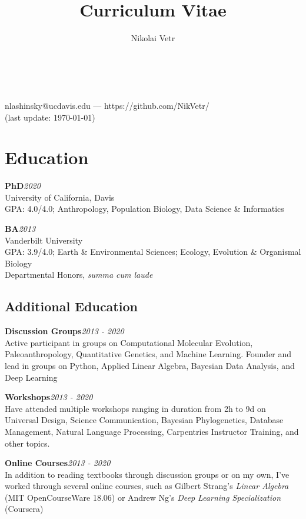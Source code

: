 \documentclass[12pt]{article}
\makeatletter
\newcommand{\cvcolor}{\color{Maroon}} %
\renewcommand{\maketitle}{
\begin{center}

{\Huge\theauthor}\\
\vspace{0.25em}
{\Large \cvcolor{University of California, Davis}}\\

nlashinsky@ucdavis.edu --- https://github.com/NikVetr/\\

{\color{Gray}(last update: \today)}
\end{center}
}
\makeatother
\begin{document}
\title{Curriculum Vitae} %
\author{Nikolai Vetr}

\maketitle

\vspace{-1.5em}

\section{Education}

\textbf{PhD}\hfill\emph{2020}\\
University of California, Davis\\
GPA: 4.0/4.0; Anthropology, Population Biology, Data Science \& Informatics

\textbf{BA}\hfill\emph{2013}\\
Vanderbilt University\\
GPA: 3.9/4.0; Earth \& Environmental Sciences; Ecology, Evolution \& Organismal Biology\\
Departmental Honors, \textit{summa cum laude}\\
\vspace{-1.25em}
\subsection{Additional Education}

\textbf{Discussion Groups}\hfill\emph{2013 - 2020}\\
Active participant in groups on Computational Molecular Evolution, Paleoanthropology, Quantitative Genetics, and Machine Learning. Founder and lead in groups on Python, Applied Linear Algebra, Bayesian Data Analysis, and Deep Learning

\textbf{Workshops}\hfill\emph{2013 - 2020}\\
Have attended multiple workshops ranging in duration from 2h to 9d on Universal Design, Science Communication, Bayesian Phylogenetics, Database Management, Natural Language Processing, Carpentries Instructor Training, and other topics.

\textbf{Online Courses}\hfill\emph{2013 - 2020}\\
In addition to reading textbooks through discussion groups or on my own, I've worked through several online courses, such as Gilbert Strang's \emph{Linear Algebra} (MIT OpenCourseWare 18.06) or Andrew Ng's \emph{Deep Learning Specialization} (Coursera)
\end{document}
